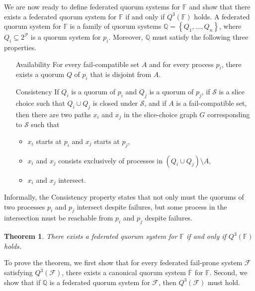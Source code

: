 \documentclass[11pt]{article}
\newtheorem{thm}{Theorem}
\begin{document}
We are now ready to define federated quorum systems for $\mathbb{F}$ and show that there exists a federated quorum system for $\mathbb{F}$ if and only if $Q^3(\mathbb{F})$ holds. A federated quorum system for $\mathbb{F}$ is a family of quorum systems $\mathbb{Q}=\left\{Q_1,...,Q_n\right\}$, where $Q_i\subseteq 2^\mathcal{P}$ is a quorum system for $p_i$. Moreover, $\mathbb{Q}$ must satisfy the following three properties.
\begin{itemize}
  \item [Availability] For every fail-compatible set $A$ and for every process $p_i$, there exists a quorum $Q$ of $p_i$ that is disjoint from $A$.
  \item[Consistency] If $Q_i$ is a quorum of $p_i$ and $Q_j$ is a quorum of $p_j$, if $\mathcal{S}$ is a slice choice such that $Q_i\cup Q_j$ is closed under $\mathcal{S}$, and if $A$ is a fail-compatible set, then there are two paths $x_i$ and $x_j$ in the slice-choice graph $G$ corresponding to $\mathcal{S}$ such that
    \begin{itemize}
      \item $x_i$ starts at $p_i$ and $x_j$ starts at $p_j$,
      \item $x_i$ and $x_j$ consists exclusively of processes in $\left(Q_i\cup Q_j\right)\setminus A$,
      \item $x_i$ and $x_j$ intersect.
    \end{itemize}
\end{itemize}

Informally, the Consistency property states that not only must the quorums of two processes $p_i$ and $p_j$ intersect despite failures, but some process in the intersection must be reachable from $p_i$ and $p_j$ despite failures.

\begin{thm}
  There exists a federated quorum system for $\mathbb{F}$ if and only if $Q^3(\mathbb{F})$ holds.
\end{thm}

To prove the theorem, we first show that for every federated fail-prone system $\mathcal{F}$ satisfying $Q^3(\mathcal{F})$, there exists a canonical quorum system $\overline{\mathbb{F}}$ for $\mathbb{F}$. Second, we show that if $\mathbb{Q}$ is a federated quorum system for $\mathcal{F}$, then $Q^3(\mathcal{F})$ must hold.
\end{document}
